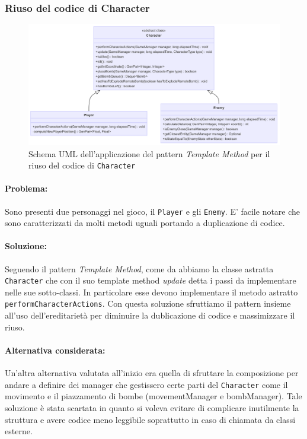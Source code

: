 \documentclass[a4paper,12pt]{report}
\begin{document}
\subsubsection{Riuso del codice di Character}
\begin{figure}[H]
\centering{}
\includegraphics[width=1.0\columnwidth]{img/character-template-method-uml.png}
\caption{Schema UML dell’applicazione del pattern \textit{Template Method} per il riuso del codice di \texttt{Character}}
\label{img:uml-character-template-method}
\end{figure}
\paragraph{Problema:} Sono presenti due personaggi nel gioco, il \texttt{Player} e gli \texttt{Enemy}. E' facile notare che sono caratterizzati da molti metodi uguali portando a duplicazione di codice.
\paragraph{Soluzione:} Seguendo il pattern \textit{Template Method}, come da
 abbiamo la classe astratta \texttt{Character} che con il suo template method \textit{update} detta i passi da implementare nelle sue sotto-classi. In particolare esse devono implementare il metodo astratto \texttt{performCharacterActions}. Con questa soluzione sfruttiamo il pattern insieme all'uso dell'ereditarietà per diminuire la dublicazione di codice e massimizzare il riuso.
\paragraph{Alternativa considerata:} Un'altra alternativa valutata all'inizio era quella di sfruttare la composizione per andare a definire dei manager che gestissero certe parti del \texttt{Character} come il movimento e il piazzamento di bombe (movementManager e bombManager). Tale soluzione è stata scartata in quanto si voleva evitare di complicare inutilmente la struttura e avere codice meno leggibile soprattutto in caso di chiamata da classi esterne.
\end{document}
